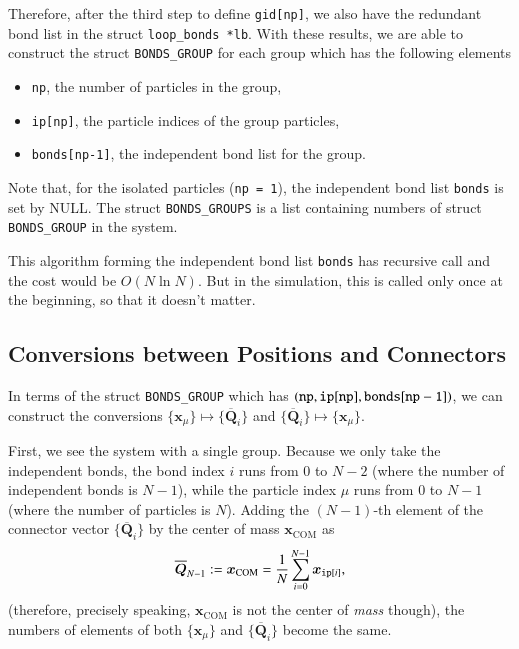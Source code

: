 Therefore, after the third step to define {\tt gid[np]}, 
we also have the redundant bond list in the struct {\tt loop\_bonds *lb}. 
With these results, we are able to construct 
the struct {\tt BONDS\_GROUP} for each group 
which has the following elements
\begin{itemize}
\item {\tt np}, the number of particles in the group,
\item {\tt ip[np]}, the particle indices of the group particles,
\item {\tt bonds[np-1]}, the independent bond list for the group.
\end{itemize}
Note that, for the isolated particles ({\tt np = 1}), 
the independent bond list {\tt bonds} is set by NULL. 
The struct {\tt BONDS\_GROUPS} is a list containing 
numbers of struct {\tt BONDS\_GROUP} in the system. 

This algorithm forming the independent bond list {\tt bonds} 
has recursive call and the cost would be $O(N\ln N)$. 
But in the simulation, this is called only once at the beginning, 
so that it doesn't matter. 


\subsection{Conversions between Positions and Connectors}
\label{sec:ref-bonds-groups-conversion-pos-conn}
In terms of the struct {\tt BONDS\_GROUP} 
which has $({\tt np}, {\tt ip[np]}, {\tt bonds[np-1]})$, 
we can construct the conversions 
$\{\bm{x}_{\mu}\}\mapsto\{\overline{\bm{Q}}_{i}\}$ 
and $\{\overline{\bm{Q}}_{i}\}\mapsto\{\bm{x}_{\mu}\}$. 

First, we see the system with a single group. 
Because we only take the independent bonds, 
the bond index $i$ runs from 0 to $N-2$ 
(where the number of independent bonds is $N-1$), 
while the particle index $\mu$ runs from 0 to $N-1$ 
(where the number of particles is $N$). 
Adding the $(N-1)$-th element of the connector vector 
$\{\overline{\bm{Q}}_{i}\}$ by the center of mass $\bm{x}_{\text{COM}}$ as 
\begin{equation}
  \overline{\bm{Q}}_{N-1}
  :=
  \bm{x}_{\text{COM}}
  =
  \frac{1}{N}
  \sum_{i=0}^{N-1}
  \bm{x}_{{\tt ip}[i]}
  ,
  \label{eq:ref-bonds-groups-last-connector-vector-COM}
\end{equation}
(therefore, precisely speaking, $\bm{x}_{\text{COM}}$ is not 
the center of \textit{mass} though), 
the numbers of elements of both $\{\bm{x}_{\mu}\}$ 
and $\{\overline{\bm{Q}}_{i}\}$ become the same. 

